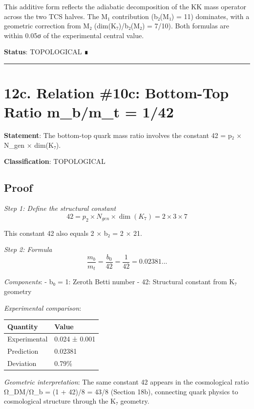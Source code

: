 \documentclass[11pt,a4paper]{article}
\begin{document}
This additive form reflects the adiabatic decomposition of the KK mass operator across the two TCS halves. The M₁ contribution (b₂(M₁) = 11) dominates, with a geometric correction from M₂ (dim(K₇)/b₂(M₂) = 7/10). Both formulas are within 0.05σ of the experimental central value.

\textbf{Status}: TOPOLOGICAL ∎

\begin{center}\rule{\linewidth}{0.5pt}\end{center}

\section{12c. Relation \#10c: Bottom-Top Ratio m\_\allowbreak{}b/m\_\allowbreak{}t = 1/42}\label{c.-relation-10c-bottom-top-ratio-m_bm_t-142}

\textbf{Statement}: The bottom-top quark mass ratio involves the constant 42 = p₂ × N\_\allowbreak{}gen × dim(K₇).

\textbf{Classification}: TOPOLOGICAL

\subsection{Proof}\label{proof-10}

\emph{Step 1: Define the structural constant} \[42 = p_2 \times N_{gen} \times \dim(K_7) = 2 \times 3 \times 7\]

This constant 42 also equals 2 × b₂ = 2 × 21.

\emph{Step 2: Formula} \[\frac{m_b}{m_t} = \frac{b_0}{42} = \frac{1}{42} = 0.02381...\]

\emph{Components}: - b₀ = 1: Zeroth Betti number - 42: Structural constant from K₇ geometry

\emph{Experimental comparison}:

\begin{longtable}[]{@{}ll@{}}
\toprule\noalign{}
Quantity & Value \\
\midrule\noalign{}
\endhead
\bottomrule\noalign{}
\endlastfoot
Experimental & 0.024 ± 0.001 \\
Prediction & 0.02381 \\
Deviation & 0.79\% \\
\end{longtable}

\emph{Geometric interpretation}: The same constant 42 appears in the cosmological ratio Ω\_\allowbreak{}DM/Ω\_\allowbreak{}b = (1 + 42)/8 = 43/8 (Section 18b), connecting quark physics to cosmological structure through the K₇ geometry.
\end{document}
